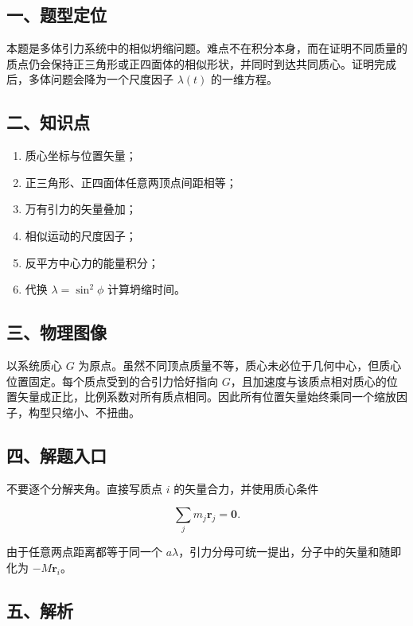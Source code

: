 \documentclass[12pt,a4paper,UTF8]{ctexart}
\newcommand{\tightlist}{\setlength{\itemsep}{0pt}\setlength{\parskip}{0pt}}
\begin{document}
\subsection{一、题型定位}\label{ux4e00ux9898ux578bux5b9aux4f4d-1}

本题是多体引力系统中的相似坍缩问题。难点不在积分本身，而在证明不同质量的质点仍会保持正三角形或正四面体的相似形状，并同时到达共同质心。证明完成后，多体问题会降为一个尺度因子
\(\lambda(t)\) 的一维方程。

\subsection{二、知识点}\label{ux4e8cux77e5ux8bc6ux70b9-1}

\begin{enumerate}
\def\labelenumi{\arabic{enumi}.}
\tightlist
\item
  质心坐标与位置矢量；
\item
  正三角形、正四面体任意两顶点间距相等；
\item
  万有引力的矢量叠加；
\item
  相似运动的尺度因子；
\item
  反平方中心力的能量积分；
\item
  代换 \(\lambda=\sin^2\phi\) 计算坍缩时间。
\end{enumerate}

\subsection{三、物理图像}\label{ux4e09ux7269ux7406ux56feux50cf-1}

以系统质心 \(G\)
为原点。虽然不同顶点质量不等，质心未必位于几何中心，但质心位置固定。每个质点受到的合引力恰好指向
\(G\)，且加速度与该质点相对质心的位置矢量成正比，比例系数对所有质点相同。因此所有位置矢量始终乘同一个缩放因子，构型只缩小、不扭曲。

\subsection{四、解题入口}\label{ux56dbux89e3ux9898ux5165ux53e3-1}

不要逐个分解夹角。直接写质点 \(i\) 的矢量合力，并使用质心条件

\[
\sum_jm_j\boldsymbol r_j=\boldsymbol0.
\]

由于任意两点距离都等于同一个
\(a\lambda\)，引力分母可统一提出，分子中的矢量和随即化为
\(-M\boldsymbol r_i\)。

\subsection{五、解析}\label{ux4e94ux89e3ux6790-1}
\end{document}
